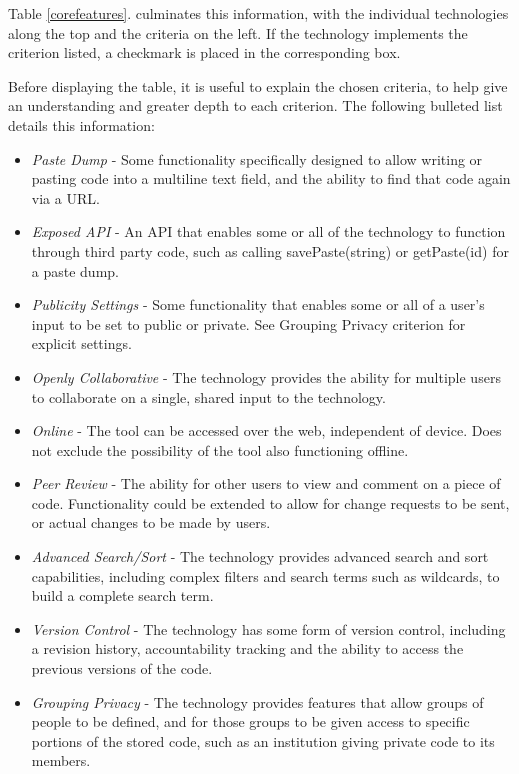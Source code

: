 Table \ref{corefeatures}. culminates this information, with the individual technologies along the top and the criteria on the left. If the technology implements the criterion listed, a checkmark is placed in the corresponding box.

Before displaying the table, it is useful to explain the chosen criteria, to help give an understanding and greater depth to each criterion. The following bulleted list details this information:

\begin{itemize}
\item \textit{Paste Dump} - Some functionality specifically designed to allow writing or pasting code into a multiline text field, and the ability to find that code again via a URL. 
\item \textit{Exposed API} - An API that enables some or all of the technology to function through third party code, such as calling savePaste(string) or getPaste(id) for a paste dump.
\item \textit{Publicity Settings} - Some functionality that enables some or all of a user's input to be set to public or private. See Grouping Privacy criterion for explicit settings.
\item \textit{Openly Collaborative} - The technology provides the ability for multiple users to collaborate on a single, shared input to the technology. 
\item \textit{Online} - The tool can be accessed over the web, independent of device. Does not exclude the possibility of the tool also functioning offline.
\item \textit{Peer Review} - The ability for other users to view and comment on a piece of code. Functionality could be extended to allow for change requests to be sent, or actual changes to be made by users.
\item \textit{Advanced Search/Sort} - The technology provides advanced search and sort capabilities, including complex filters and search terms such as wildcards, to build a complete search term. 
\item \textit{Version Control} - The technology has some form of version control, including a revision history, accountability tracking and the ability to access the previous versions of the code. 
\item \textit{Grouping Privacy} - The technology provides features that allow groups of people to be defined, and for those groups to be given access to specific portions of the stored code, such as an institution giving private code to its members.

\end{itemize}
